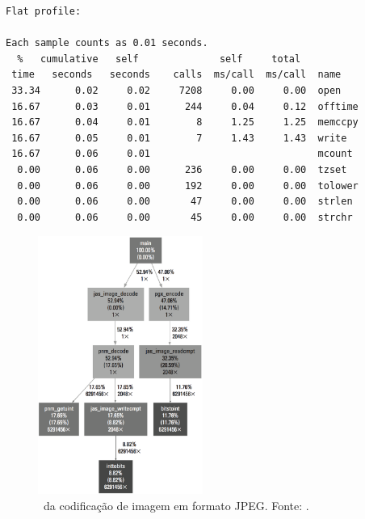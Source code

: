 { \footnotesize
      \begin{verbatim}
Flat profile:

Each sample counts as 0.01 seconds.
  %   cumulative   self              self     total
 time   seconds   seconds    calls  ms/call  ms/call  name
 33.34      0.02     0.02     7208     0.00     0.00  open
 16.67      0.03     0.01      244     0.04     0.12  offtime
 16.67      0.04     0.01        8     1.25     1.25  memccpy
 16.67      0.05     0.01        7     1.43     1.43  write
 16.67      0.06     0.01                             mcount
  0.00      0.06     0.00      236     0.00     0.00  tzset
  0.00      0.06     0.00      192     0.00     0.00  tolower
  0.00      0.06     0.00       47     0.00     0.00  strlen
  0.00      0.06     0.00       45     0.00     0.00  strchr
      \end{verbatim}
      \vspace{-3em}
}

      \begin{figure} \centering
         \includegraphics[width=0.48\textwidth]{img/f4-1-2.png}
         \caption{\Profile\ da codificação de imagem em formato JPEG. Fonte: \cite{Sass2010}. \vspace{-0em} }
         \label{fig:profile}
      \end{figure}

